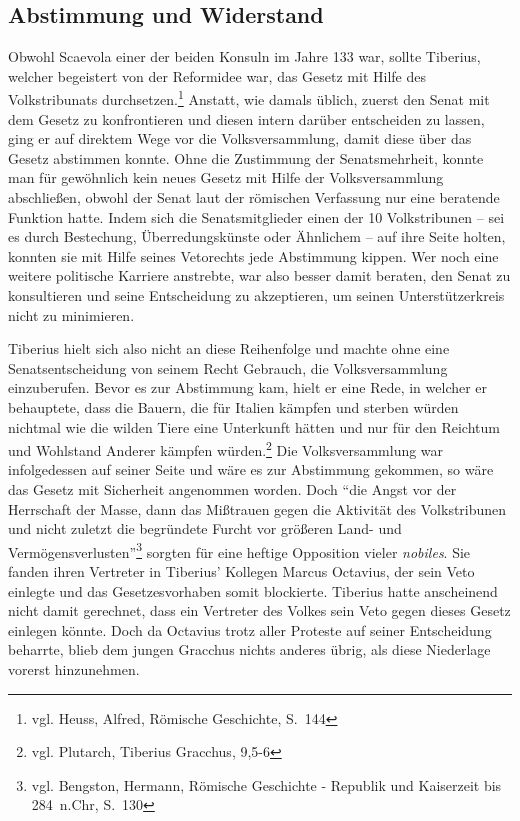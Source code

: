 \documentclass[
    12pt,
    smallheadings,
    ]{scrreprt}
\begin{document}
        \subsection{Abstimmung und Widerstand}
Obwohl Scaevola einer der beiden Konsuln im Jahre 133 war, sollte Tiberius, welcher begeistert von der Reformidee war, das Gesetz mit Hilfe des Volkstribunats durchsetzen.\footnote{vgl. Heuss, Alfred, Römische Geschichte, S.~144}
Anstatt, wie damals üblich, zuerst den Senat mit dem Gesetz zu konfrontieren und diesen intern darüber entscheiden zu lassen, ging er auf direktem Wege vor die Volksversammlung, damit diese über das Gesetz abstimmen konnte.
Ohne die Zustimmung der Senatsmehrheit, konnte man für gewöhnlich kein neues Gesetz mit Hilfe der Volksversammlung abschließen, obwohl der Senat laut der römischen Verfassung nur eine beratende Funktion hatte.
Indem sich die Senatsmitglieder einen der 10 Volkstribunen -- sei es durch Bestechung, Überredungskünste oder Ähnlichem -- auf ihre Seite holten, konnten sie mit Hilfe seines Vetorechts jede Abstimmung kippen.
Wer noch eine weitere politische Karriere anstrebte, war also besser damit beraten, den Senat zu konsultieren und seine Entscheidung zu akzeptieren, um seinen Unterstützerkreis nicht zu minimieren.

Tiberius hielt sich also nicht an diese Reihenfolge und machte ohne eine Senatsentscheidung von seinem Recht Gebrauch, die Volksversammlung einzuberufen.
Bevor es zur Abstimmung kam, hielt er eine Rede, in welcher er behauptete, dass die Bauern, die für Italien kämpfen und sterben würden nichtmal wie die wilden Tiere eine Unterkunft hätten und nur für den Reichtum und Wohlstand Anderer kämpfen würden.\footnote{vgl. Plutarch, Tiberius Gracchus, 9,5-6}
Die Volksversammlung war infolgedessen auf seiner Seite und wäre es zur Abstimmung gekommen, so wäre das Gesetz mit Sicherheit angenommen worden.
Doch "`die Angst vor der Herrschaft der Masse, dann das Mißtrauen gegen die Aktivität des Volkstribunen und nicht zuletzt die begründete Furcht vor größeren Land- und Vermögensverlusten"'\footnote{vgl. Bengston, Hermann, Römische Geschichte - Republik und Kaiserzeit bis 284~n.Chr, S.~130}
sorgten für eine heftige Opposition vieler \textit{nobiles}.
Sie fanden ihren Vertreter in Tiberius' Kollegen Marcus Octavius, der sein Veto einlegte und das Gesetzesvorhaben somit blockierte.
Tiberius hatte anscheinend nicht damit gerechnet, dass ein Vertreter des Volkes sein Veto gegen dieses Gesetz einlegen könnte.
Doch da Octavius trotz aller Proteste auf seiner Entscheidung beharrte, blieb dem jungen Gracchus nichts anderes übrig, als diese Niederlage vorerst hinzunehmen.
\end{document}
